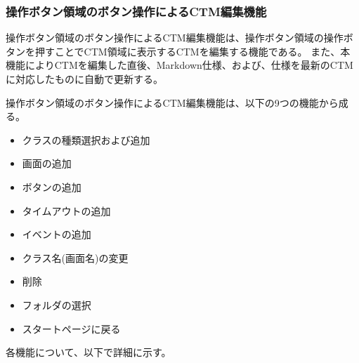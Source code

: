 \subsubsection{操作ボタン領域のボタン操作によるCTM編集機能}\label{sec:ButtonFunction}

操作ボタン領域のボタン操作によるCTM編集機能は、操作ボタン領域の操作ボタンを押すことでCTM領域に表示するCTMを編集する機能である。
また、本機能によりCTMを編集した直後、Markdown仕様、および、\VDM 仕様を最新のCTMに対応したものに自動で更新する。

操作ボタン領域のボタン操作によるCTM編集機能は、以下の9つの機能から成る。
\begin{itemize}
  \item クラスの種類選択および追加
  \item 画面の追加
  \item ボタンの追加
  \item タイムアウトの追加
  \item イベントの追加
  \item クラス名(画面名)の変更
  \item 削除
  \item フォルダの選択
  \item スタートページに戻る
\end{itemize}
各機能について、以下で詳細に示す。
